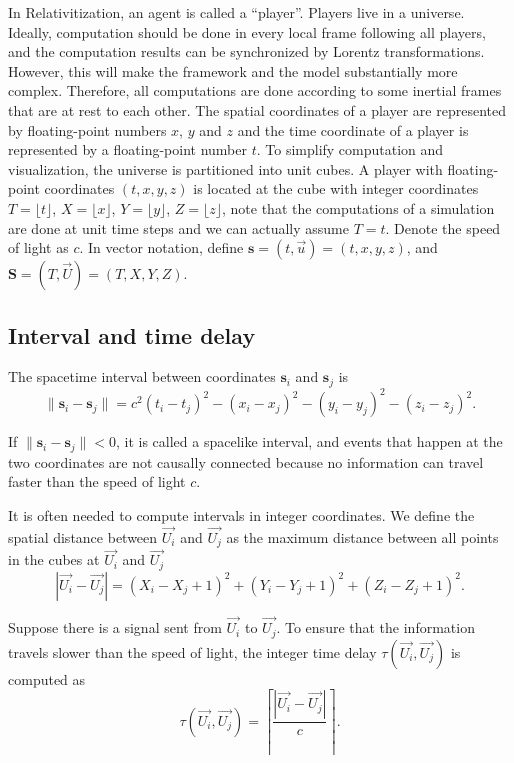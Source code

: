\documentclass{svproc}
\begin{document}
In Relativitization, an agent is called a ``player''.
Players live in a universe.
Ideally, computation should be done in every local frame following all players, 
and the computation results can be synchronized by Lorentz transformations.
However, this will make the framework and the model substantially more complex.
Therefore, all computations are done according to some inertial frames that are at rest to each other.
The spatial coordinates of a player are represented by floating-point numbers $x$, $y$ and $z$
and the time coordinate of a player is represented by a floating-point number $t$.
To simplify computation and visualization, the universe is partitioned into unit cubes.
A player with floating-point coordinates $(t, x, y, z)$ is located at the cube 
with integer coordinates $T = \lfloor t \rfloor$, $X = \lfloor x \rfloor$, $Y = \lfloor y \rfloor$, $Z = \lfloor z \rfloor$,
note that the computations of a simulation are done at unit time steps and we can actually assume $T = t$.
Denote the speed of light as $c$.
In vector notation, define $\textbf{s} = (t, \overrightarrow{u}) = (t, x, y, z)$, and 
$\textbf{S} = (T, \overrightarrow{U}) = (T, X, Y, Z)$.

\subsection{Interval and time delay}

The spacetime interval between coordinates $\textbf{s}_i$ and $\textbf{s}_j$ is
\begin{equation}
    \|\textbf{s}_i - \textbf{s}_j\| = c^2 (t_i - t_j)^2 - (x_i - x_j)^2 - (y_i - y_j)^2 - (z_i - z_j)^2.
\end{equation}

If $\|\textbf{s}_i - \textbf{s}_j\| < 0$, it is called a spacelike interval, and events that happen at the two coordinates
are not causally connected because no information can travel faster than the speed of light $c$.

It is often needed to compute intervals in integer coordinates.
We define the spatial distance between $\overrightarrow{U_i}$
and $\overrightarrow{U_j}$ as the maximum distance between all points in the cubes at 
$\overrightarrow{U_i}$ and $\overrightarrow{U_j}$
\begin{equation} \label{eq:delay}
    |\overrightarrow{U_i} - \overrightarrow{U_j}| = (X_i - X_j + 1)^2 + (Y_i - Y_j + 1)^2 + (Z_i - Z_j + 1)^2.
\end{equation}

Suppose there is a signal sent from $\overrightarrow{U_i}$ to $\overrightarrow{U_j}$.
To ensure that the information travels slower than the speed of light, 
the integer time delay $\tau(\overrightarrow{U_i}, \overrightarrow{U_j})$ is computed as
\begin{equation} 
    \tau(\overrightarrow{U_i}, \overrightarrow{U_j}) = \left \lceil \frac{|\overrightarrow{U_i} - \overrightarrow{U_j}|}{c} \right \rceil.
\end{equation}
\end{document}

